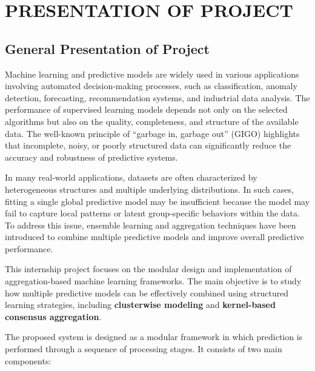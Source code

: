 \chapter{PRESENTATION OF PROJECT}

\section{General Presentation of Project}

\hs Machine learning and predictive models are widely used in various applications involving automated decision-making processes, such as classification, anomaly detection, forecasting, recommendation systems, and industrial data analysis. The performance of supervised learning models depends not only on the selected algorithms but also on the quality, completeness, and structure of the available data. The well-known principle of ``garbage in, garbage out'' (GIGO) highlights that incomplete, noisy, or poorly structured data can significantly reduce the accuracy and robustness of predictive systems.

In many real-world applications, datasets are often characterized by heterogeneous structures and multiple underlying distributions. In such cases, fitting a single global predictive model may be insufficient because the model may fail to capture local patterns or latent group-specific behaviors within the data. To address this issue, ensemble learning and aggregation techniques have been introduced to combine multiple predictive models and improve overall predictive performance.

This internship project focuses on the modular design and implementation of aggregation-based machine learning frameworks. The main objective is to study how multiple predictive models can be effectively combined using structured learning strategies, including \textbf{clusterwise modeling} and \textbf{kernel-based consensus aggregation}.

The proposed system is designed as a modular framework in which prediction is performed through a sequence of processing stages. It consists of two main components:

